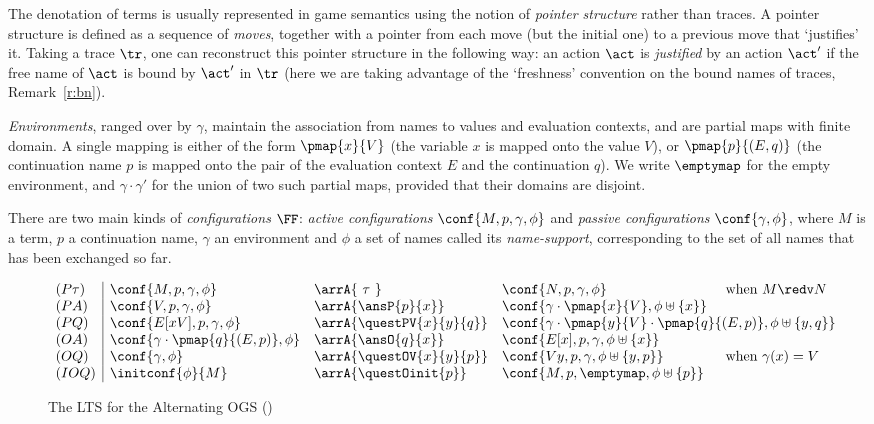 \begin{remark}
 \label{rmk:justified-sequence}
The denotation of terms is usually represented in game semantics using 
the notion of \emph{pointer structure} rather than traces.
A pointer structure is defined as a sequence of \emph{moves}, 
together with a pointer from each move (but the initial one) to a previous move 
that  `justifies' it.
Taking a trace $\tr$, one can reconstruct this pointer structure in the following way:
an action $\act$ is \emph{justified} by an action $\act'$
if the free name of $\act$ is bound by $\act'$ in $\tr$ (here we are taking advantage of
the `freshness' convention on the bound names of traces, Remark~\ref{r:bn}).
\end{remark}


\emph{Environments}, ranged over by $\gamma$, 
maintain the association from names to values and evaluation contexts, and  
 are partial maps with finite domain. A single mapping is either of the form 
$\pmap{x}{V}$
(the variable $x$ is mapped onto the  value $V$), or 
$\pmap{p}{(E,q)}$ 
(the continuation name $p$ is mapped onto the 
pair of the  evaluation context $E$ and the continuation $q$).
We write $\emptymap$ for the empty environment,
and $\gamma \cdot \gamma'$ for the union of two such partial maps,
provided that their domains are disjoint.


There are two main kinds of \emph{configurations} $\FF$:
\emph{active configurations} $\conf{M,p,\gamma,\phi}$ and 
\emph{passive configurations}
$\conf{\gamma,\phi}$, where $M$ is a term, $p$ a continuation name, 
$\gamma$ an environment and $\phi$ a set of names called its \emph{name-support},
corresponding to the set of all names that has been exchanged so far.
 

 \begin{figure}
 \[
  \begin{array}{l|llll}
   (P\tau) & \conf{M,p,\gamma,\phi} & \arrA{\ \tau \ } & 
     \conf{N,p,\gamma,\phi} & \text{ when } M \redv N\\
%
   (PA) & \conf{V,p,\gamma,\phi} & \arrA{\ansP{p}{x}} & 
     \conf{\gamma \cdot \pmap{x}{V},\phi \uplus \{x\}} \\
%
   (PQ) & \conf{E[xV],p,\gamma,\phi} & \arrA{\questPV{x}{y}{q}} & 
     \multicolumn{2}{l}{\conf{\gamma \cdot \pmap{y}{V}\cdot \pmap{q}{(E,p)},\phi 
       \uplus \{y,q\}}} \\
%
   (OA) & \conf{\gamma\cdot \pmap{q}{(E,p)},\phi} & \arrA{\ansO{q}{x}} & 
     \conf{E[x],p,\gamma,\phi \uplus \{x\}}\\
%
   (OQ) & \conf{\gamma,\phi} & \arrA{\questOV{x}{y}{p}} & 
     \conf{V y,p,\gamma,\phi \uplus \{y,p\}} & \text{ when } \gamma(x) = V\\
%
   (IOQ) & \initconf{\phi}{M} & \arrA{\questOinit{p}} &
     \conf{M,p,\emptymap,\phi \uplus \{p\}}
  \end{array}\]
 \caption{The  LTS for the  Alternating OGS (\AOGS)}
 \label{fig:seq-ogs-lts}
\end{figure}

